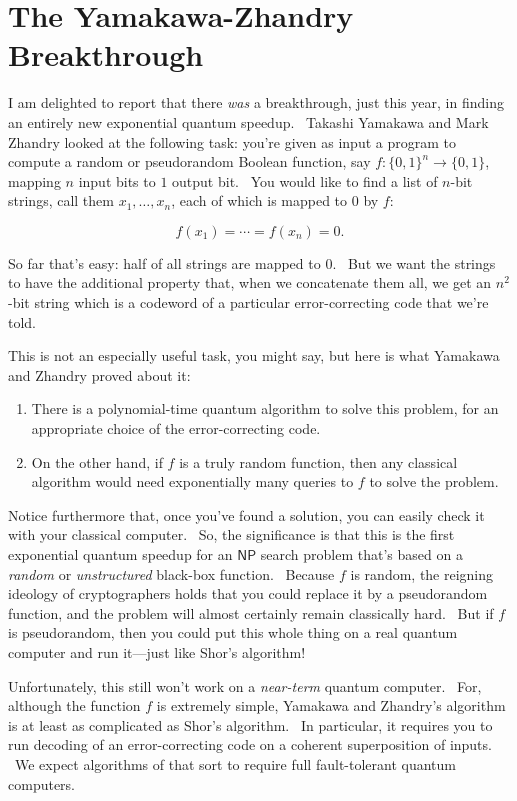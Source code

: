\documentclass[11pt]{article}
\begin{document}
\section{The Yamakawa-Zhandry Breakthrough}

I am delighted to report that there \emph{was} a breakthrough, just this year, in finding an entirely new exponential quantum speedup. \ Takashi Yamakawa and Mark Zhandry \cite{yz} looked at the following task: you're given as input a program to compute a random or pseudorandom Boolean function, say $f:\{0,1\}^n\rightarrow \{0,1\}$, mapping $n$ input bits to $1$ output bit. \ You would like to find a list of $n$-bit strings, call them $x_1,\ldots,x_n$, each of which is mapped to $0$ by $f$:

$$ f(x_1) = \cdots = f(x_n) = 0.$$

So far that's easy: half of all strings are mapped to $0$. \ But we want the strings to have the additional property that, when we concatenate them all, we get an $n^2$-bit string which is a codeword of a particular error-correcting code that we're told.

This is not an especially useful task, you might say, but here is what Yamakawa and Zhandry proved about it:

\begin{enumerate}
\item There is a polynomial-time quantum algorithm to solve this problem, for an appropriate choice of the error-correcting code.

\item On the other hand, if $f$ is a truly random function, then any classical algorithm would need exponentially many queries to $f$ to solve the problem.
\end{enumerate}

Notice furthermore that, once you've found a solution, you can easily check it with your classical computer. \ So, the significance is that this is the first exponential quantum speedup for an $\mathsf{NP}$ search problem that's based on a \emph{random} or \emph{unstructured} black-box function. \ Because $f$ is random, the reigning ideology of cryptographers holds that you could replace it by a pseudorandom function, and the problem will almost certainly remain classically hard. \ But if $f$ is pseudorandom, then you could put this whole thing on a real quantum computer and run it---just like Shor's algorithm!

Unfortunately, this still won't work on a \emph{near-term} quantum computer. \ For, although the function $f$ is extremely simple, Yamakawa and Zhandry's algorithm is at least as complicated as Shor's algorithm. \ In particular, it requires you to run decoding of an error-correcting code on a coherent superposition of inputs. \ We expect algorithms of that sort to require full fault-tolerant quantum computers.
\end{document}
